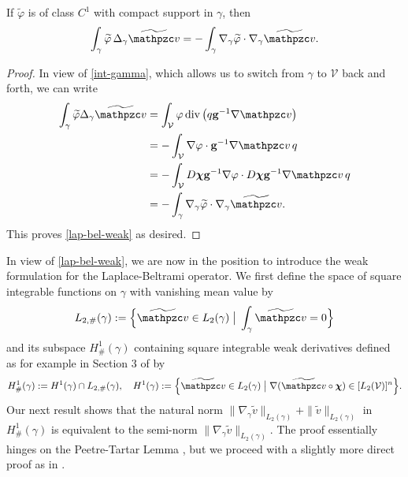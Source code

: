 \begin{lemma}
If $\widetilde\varphi$ is of class $C^1$ with compact support in $\gamma$, then
  \begin{equation}\label{lap-bel-weak}
    \int_\gamma \widetilde\varphi \, \Delta_\gamma \widetilde\tv =
    - \int_\gamma \nabla_\gamma \widetilde\varphi \cdot \nabla_\gamma \widetilde\tv.
  \end{equation}  
\end{lemma}
\begin{proof}
In view of \eqref{int-gamma}, which allows us to switch from $\gamma$ to $\mathcal{V}$
back and forth, we can write
%
\begin{align*}
  \int_\gamma \widetilde\varphi \Delta_\gamma \widetilde\tv
  &= \int_{\mathcal V} \varphi \, \div{q\bg^{-1}\nabla\tv}
  \\
  &= - \int_{\mathcal V} \nabla\varphi \cdot \bg^{-1} \nabla \tv \, q
  \\
  &= -\int_{\mathcal V} D\bchi \bg^{-1} \nabla\varphi \cdot D\bchi \bg^{-1} \nabla\tv \, q
  \\
  &= -\int_\gamma \nabla_\gamma\widetilde\varphi \cdot \nabla_\gamma \widetilde\tv.
\end{align*}
%
This proves \eqref{lap-bel-weak} as desired.
\end{proof}

In view of \eqref{lap-bel-weak}, we are now in the position to introduce the
weak formulation for the Laplace-Beltrami operator. We first define the space
of square integrable functions on $\gamma$ with vanishing mean value by
%
\[
 L_{2,\#}(\gamma) := \Big\{\widetilde \tv \in L_2(\gamma) \;\big|\; \int_\gamma \widetilde \tv = 0\Big\}
\]
%
and its subspace $H^1_\#(\gamma)$ containing square integrable weak derivatives defined as for example in Section 3 of \cite{JK95} by
%
\begin{equation*}
  H^1_\#(\gamma) := H^1(\gamma) \cap L_{2,\#}(\gamma),
  \quad
  H^1(\gamma) := \Big\{\widetilde \tv\in L_2(\gamma) \;\big|\; 
          \nabla(\widetilde \tv \circ  \bchi) \in [L_2(\mathcal V)]^{n}\Big\}.
\end{equation*}
%
Our next result shows that the natural norm $\| \nabla_\gamma \widetilde v \|_{L_2(\gamma)}+\|\widetilde v \|_{L_2(\gamma)}$ in $H^1_\#(\gamma)$ is equivalent to the semi-norm $\| \nabla_\gamma \widetilde v \|_{L_2(\gamma)}$. The proof essentially hinges on the Peetre-Tartar Lemma \cite{MR0221282,MR532371}, but we proceed with a slightly more direct proof as in \cite[Section 5.8.1]{Ev98}.

